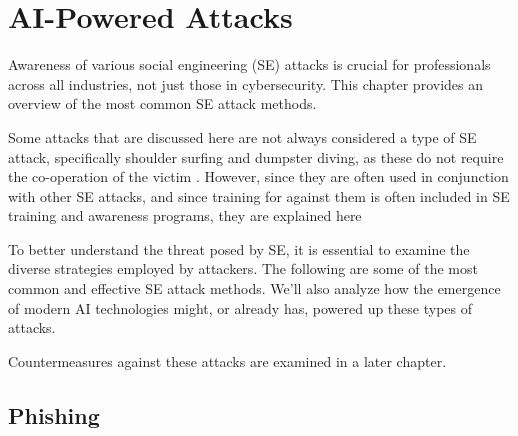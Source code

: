 


\chapter{AI-Powered Attacks\label{attacks}}

Awareness of various social engineering (SE) attacks is crucial for professionals across all industries, not just those in cybersecurity. This chapter provides an overview of the most common SE attack methods.


Some attacks that are discussed here are not always considered a type of SE attack, specifically shoulder surfing and dumpster diving, as these do not require the co-operation of the victim \citep{wang_defining_2020}. However, since they are often used in conjunction with other SE attacks, and since training for against them is often included in SE training and awareness programs, they are explained here


To better understand the threat posed by SE, it is essential to examine the diverse strategies employed by attackers. The following are some of the most common and effective SE attack methods. We'll also analyze how the emergence of modern AI technologies might, or already has, powered up these types of attacks.

Countermeasures against these attacks are examined in a later chapter.










\section{Phishing}


